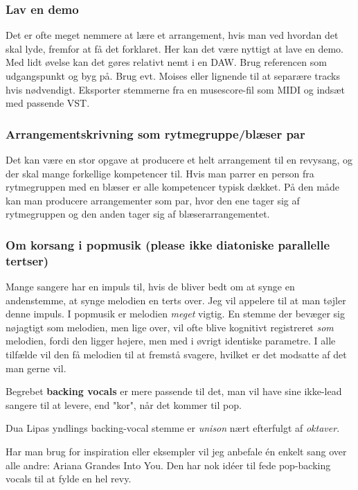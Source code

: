 \subsubsection{Lav en demo}
Det er ofte meget nemmere at lære et arrangement, hvis man ved hvordan det skal lyde, fremfor at få det forklaret. Her kan det være nyttigt at lave en demo. Med lidt øvelse kan det gøres relativt nemt i en DAW. Brug referencen som udgangspunkt og byg på. Brug evt. Moises eller lignende til at separære tracks hvis nødvendigt. Eksporter stemmerne fra en musescore-fil som MIDI og indsæt med passende VST.

\subsubsection{Arrangementskrivning som rytmegruppe/blæser par}
Det kan være en stor opgave at producere et helt arrangement til en revysang, og der skal mange forkellige kompetencer til. Hvis man parrer en person fra rytmegruppen med en blæser er alle kompetencer typisk dækket. På den måde kan man producere arrangementer som par, hvor den ene tager sig af rytmegruppen og den anden tager sig af blæserarrangementet.

\subsubsection{Om korsang i popmusik (please ikke diatoniske parallelle tertser)}
Mange sangere har en impuls til, hvis de bliver bedt om at synge en andenstemme, at synge melodien en terts over.
Jeg vil appelere til at man tøjler denne impuls. I popmusik er melodien \textit{meget} vigtig.
En stemme der bevæger sig nøjagtigt som melodien, men lige over, vil ofte blive kognitivt registreret \textit{som} melodien, fordi den ligger højere, men med i øvrigt identiske parametre.
I alle tilfælde vil den få melodien til at fremstå svagere, hvilket er det modsatte af det man gerne vil.

Begrebet \textbf{backing vocals} er mere passende til det, man vil have sine ikke-lead sangere til at levere, end "kor", når det kommer til pop.

Dua Lipas yndlings backing-vocal stemme er \textit{unison} nært efterfulgt af \textit{oktaver}.

Har man brug for inspiration eller eksempler vil jeg anbefale én enkelt sang over alle andre: Ariana Grandes Into You. Den har nok idéer til fede pop-backing vocals til at fylde en hel revy.

